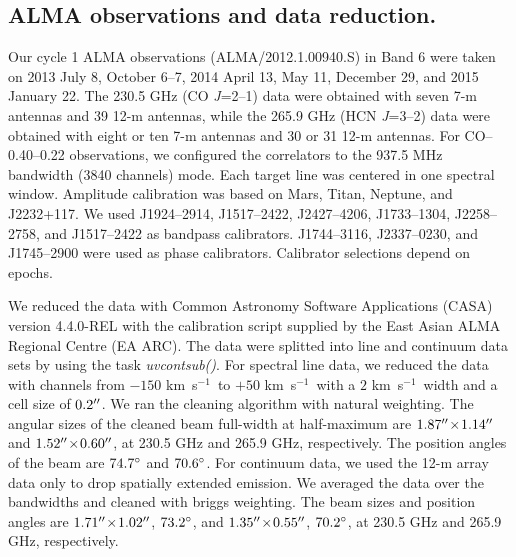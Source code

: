 \documentclass{nature}
\def\kms{\hbox{km s$^{-1}$}}
\def\arcdeg{\hbox{$^\circ$}}
\def\arcsec{\hbox{$^{\prime\prime}$}}
\begin{document}
\begin{methods}
\subsection{ALMA observations and data reduction.}
Our cycle 1 ALMA observations (ALMA/2012.1.00940.S) in Band 6 were taken on 2013 July 8, October 6--7, 2014 April 13, May 11, December 29, and 2015 January 22. The 230.5 GHz (CO {\it J}=2--1) data were obtained with seven 7-m antennas and 39 12-m antennas, while the 265.9 GHz (HCN {\it J}=3--2) data were obtained with eight or ten 7-m antennas and 30 or 31 12-m antennas. For CO--0.40--0.22 observations, we configured the correlators to the 937.5 MHz bandwidth (3840 channels) mode. Each target line was centered in one spectral window. Amplitude calibration was based on Mars, Titan, Neptune, and J2232+117. We used J1924--2914, J1517--2422, J2427--4206, J1733--1304, J2258--2758, and J1517--2422 as bandpass calibrators.  J1744--3116, J2337--0230, and J1745--2900 were used as phase calibrators. Calibrator selections depend on epochs.  

We reduced the data with Common Astronomy Software Applications (CASA) version 4.4.0-REL with the calibration script supplied by the East Asian ALMA Regional Centre (EA ARC). The data were splitted into line and continuum data sets by using the task {\it uvcontsub()}. For spectral line data, we reduced the data with channels from $-150$ \kms\ to $+50$ \kms\ with a $2$ \kms\ width and a cell size of $0.2\arcsec$.  We ran the cleaning algorithm with natural weighting. The angular sizes of the cleaned beam full-width at half-maximum are $1.87\arcsec\!\times\! 1.14\arcsec$ and $1.52\arcsec\!\times\! 0.60\arcsec$, at 230.5 GHz and 265.9 GHz, respectively. The position angles of the beam are $74.7\arcdeg$ and $70.6\arcdeg$. For continuum data, we used the 12-m array data only to drop spatially extended emission. We averaged the data over the bandwidths and cleaned with briggs weighting. The beam sizes and position angles are $1.71\arcsec\!\times\! 1.02\arcsec$, $73.2\arcdeg$, and $1.35\arcsec\!\times\! 0.55\arcsec$, $70.2\arcdeg$, at 230.5 GHz and 265.9 GHz, respectively.  


\end{methods}
\end{document}
